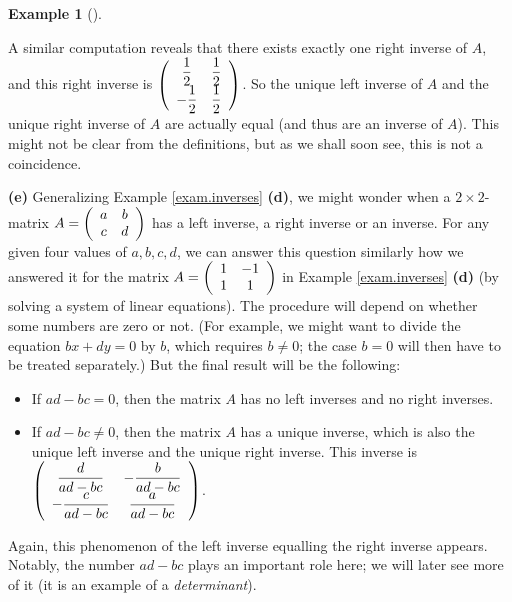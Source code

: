 \documentclass[numbers=enddot,12pt,final,onecolumn,notitlepage]{scrartcl}%
\theoremstyle{definition}
\newtheorem{exam}[theo]{Example}
\newenvironment{example}[1][]
{\begin{exam}[#1]\begin{leftbar}}
{\end{leftbar}\end{exam}}
\begin{document}
\begin{example}
A similar computation reveals that there exists exactly one right inverse of
$A$, and this right inverse is $\left(
\begin{array}
[c]{cc}%
\dfrac{1}{2} & \dfrac{1}{2}\\
-\dfrac{1}{2} & \dfrac{1}{2}%
\end{array}
\right)  $. So the unique left inverse of $A$ and the unique right inverse of
$A$ are actually equal (and thus are an inverse of $A$). This might not be
clear from the definitions, but as we shall soon see, this is not a coincidence.

\textbf{(e)} Generalizing Example \ref{exam.inverses} \textbf{(d)}, we might
wonder when a $2\times2$-matrix $A=\left(
\begin{array}
[c]{cc}%
a & b\\
c & d
\end{array}
\right)  $ has a left inverse, a right inverse or an inverse. For any given
four values of $a,b,c,d$, we can answer this question similarly how we
answered it for the matrix $A=\left(
\begin{array}
[c]{cc}%
1 & -1\\
1 & 1
\end{array}
\right)  $ in Example \ref{exam.inverses} \textbf{(d)} (by solving a system of
linear equations). The procedure will depend on whether some numbers are zero
or not. (For example, we might want to divide the equation $bx+dy=0$ by $b$,
which requires $b\neq0$; the case $b=0$ will then have to be treated
separately.) But the final result will be the following:

\begin{itemize}
\item If $ad-bc=0$, then the matrix $A$ has no left inverses and no right inverses.

\item If $ad-bc\neq0$, then the matrix $A$ has a unique inverse, which is also
the unique left inverse and the unique right inverse. This inverse is $\left(
%
\begin{array}
[c]{cc}%
\dfrac{d}{ad-bc} & -\dfrac{b}{ad-bc}\\
-\dfrac{c}{ad-bc} & \dfrac{a}{ad-bc}%
\end{array}
\right)  $.
\end{itemize}

Again, this phenomenon of the left inverse equalling the right inverse
appears. Notably, the number $ad-bc$ plays an important role here; we will
later see more of it (it is an example of a \textit{determinant}).
\end{example}
\end{document}
